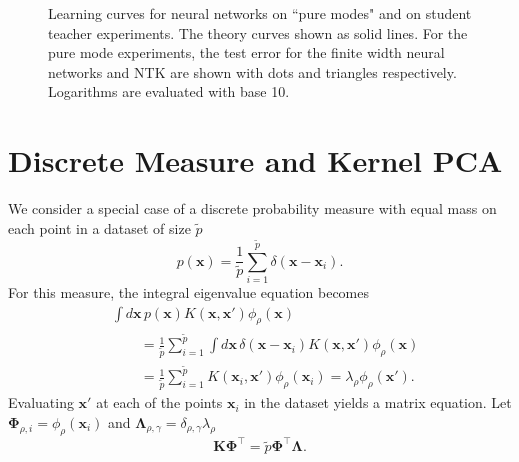 \documentclass{article}
\begin{document}
\begin{figure}[t]
\vskip -8pt
 \caption{Learning curves for neural networks on ``pure modes" and on student teacher experiments. The theory curves shown as solid lines. For the pure mode experiments, the test error for the finite width neural networks and NTK are shown with dots and triangles respectively. Logarithms are evaluated with base 10.}
\label{fig:net_errs}
\end{figure}


\section{Discrete Measure and Kernel PCA}\label{SI_KPCA}

We consider a special case of a discrete probability measure with equal mass on each point in a dataset of size $\tilde{p}$
\begin{equation}
    p(\mathbf{x}) = \frac{1}{\tilde{p}} \sum_{i=1}^{\tilde{p}} \delta(\mathbf{x}-\mathbf{x}_i).
\end{equation}
For this measure, the integral eigenvalue equation becomes
\begin{align}
    &\int d\mathbf{x}  \,p(\mathbf{x}) K(\mathbf{x},\mathbf{x}')  \phi_\rho(\mathbf{x})  \nonumber \\
    &\qquad=\frac{1}{\tilde{p}} \sum_{i=1}^{\tilde{p}} \int d\mathbf{x}\, \delta(\mathbf{x}-\mathbf{x}_i) K(\mathbf{x},\mathbf{x}') \phi_\rho(\mathbf{x})  \nonumber
    \\
    &\qquad = \frac{1}{\tilde{p}} \sum_{i=1}^{\tilde{p}} K(\mathbf{x}_i,\mathbf{x}') \phi_\rho(\mathbf{x}_i) = \lambda_\rho \phi_\rho(\mathbf{x}').
\end{align}
Evaluating $\mathbf{x}'$ at each of the points $\mathbf{x}_i$ in the dataset yields a matrix equation. Let $\mathbf{\Phi}_{\rho,i} = \phi_\rho(\mathbf{x}_i)$ and $\mathbf{\Lambda}_{\rho,\gamma} = \delta_{\rho,\gamma} \lambda_\rho$
\begin{equation}
    \mathbf{K} \mathbf{\Phi}^\top = \tilde{p}  \mathbf{\Phi}^\top \mathbf{\Lambda}.
\end{equation}
\end{document}
